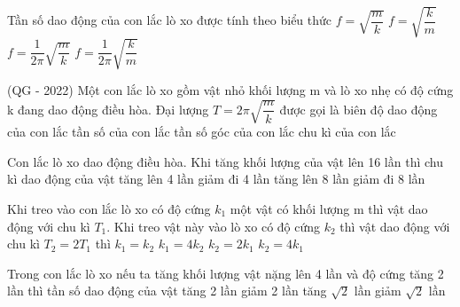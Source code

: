 
\begin{ex} %
Tần số dao động của con lắc lò xo được tính theo biểu thức
\choice
{$f=\sqrt{\dfrac{m}{k}} $}
{$f=\sqrt{\dfrac{k}{m}} $}
{$f=\dfrac{1}{2\pi}\sqrt{\dfrac{m}{k}} $}
{\True $f=\dfrac{1}{2\pi}\sqrt{\dfrac{k}{m}} $}
\end{ex} 
\begin{ex} 
(QG - 2022) Một con lắc lò xo gồm vật nhỏ khối lượng m và lò xo nhẹ có độ cứng k đang dao động điều hòa. Đại lượng $T=2\pi \sqrt{\dfrac{m}{k}}$ được gọi là
\choice
{biên độ dao động của con lắc}
{tần số của con lắc}
{tần số góc của con lắc}
{\True chu kì của con lắc}
\end{ex} 

\begin{ex}%
Con lắc lò xo dao động điều hòa. Khi tăng khối lượng của vật lên 16 lần thì chu kì dao động của vật
\choice
{\True tăng lên 4 lần}
{giảm đi 4 lần}
{tăng lên 8 lần}
{giảm đi 8 lần}
\end{ex} 


\begin{ex} %
Khi treo vào con lắc lò xo có độ cứng $k_1$ một vật có khối lượng m thì vật dao động với chu kì $T_1$. Khi treo vật này vào lò xo có độ cứng $k_2$ thì vật dao động với chu kì $T_2 = 2T_1$ thì
\choice
{$k_1 = k_2$}
{\True $k_1 = 4k_2$}
{$k_2 = 2k_1$}
{$k_2 = 4k_1$}
\end{ex} 

\begin{ex} %
Trong con lắc lò xo nếu ta tăng khối lượng vật nặng lên 4 lần và độ cứng tăng 2 lần thì tần số dao động của vật
\choice
{tăng 2 lần}
{giảm 2 lần}
{tăng $\sqrt{2}$ lần}
{\True giảm $\sqrt{2}$ lần}

\end{ex} 


